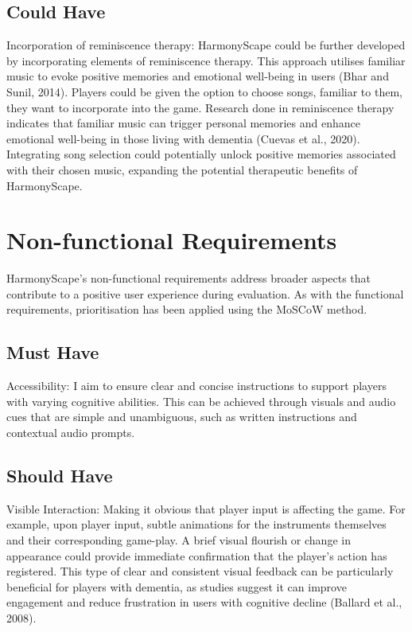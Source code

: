 \documentclass{l4proj}
\begin{document}
\subsection{Could Have}
Incorporation of reminiscence therapy: HarmonyScape could be further developed by incorporating elements of reminiscence therapy. This approach utilises familiar music to evoke positive memories and emotional well-being in users (Bhar and Sunil, 2014).  Players could be given the option to choose songs, familiar to them, they want to incorporate into the game. Research done in reminiscence therapy indicates that familiar music can trigger personal memories and enhance emotional well-being in those living with dementia (Cuevas et al., 2020). Integrating song selection could potentially unlock positive memories associated with their chosen music, expanding the potential therapeutic benefits of HarmonyScape.

\section{Non-functional Requirements}
HarmonyScape's non-functional requirements address broader aspects that contribute to a positive user experience during evaluation. As with the functional requirements, prioritisation has been applied using the MoSCoW method.

\subsection{Must Have}
Accessibility: I aim to ensure clear and concise instructions to support players with varying cognitive abilities. This can be achieved through visuals and audio cues that are simple and unambiguous, such as written instructions and contextual audio prompts.

\subsection{Should Have}
Visible Interaction: Making it obvious that player input is affecting the game. For example, upon player input, subtle animations for the instruments themselves and their corresponding game-play. A brief visual flourish or change in appearance could provide immediate confirmation that the player's action has registered. This type of clear and consistent visual feedback can be particularly beneficial for players with dementia, as studies suggest it can improve engagement and reduce frustration in users with cognitive decline (Ballard et al., 2008).
\end{document}
